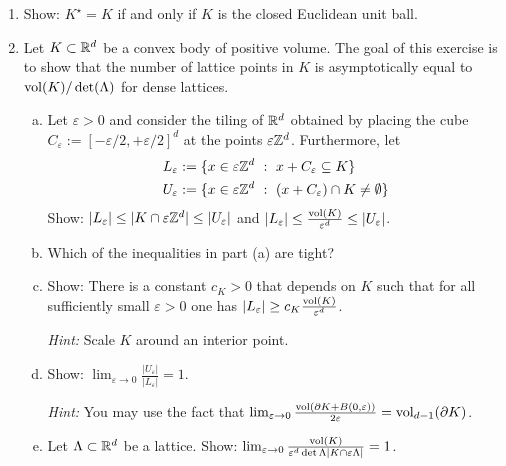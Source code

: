\begin{enumerate}
  \item Show: $K^\star = K$ if and only if $K$ is the closed Euclidean unit ball.
  
  \item Let $K \subset \mathbb{R}^d$ be a convex body of positive volume.
    The goal of this exercise is to show
    that the number of lattice points in $K$ is asymptotically equal to $\operatorname{vol}(K) / \det(\Lambda)$
    for dense lattices.
  \begin{enumerate}[(a)]
    \item Let $\varepsilon > 0$ and consider the tiling of $\mathbb{R}^d$
      obtained by placing the cube $C_\varepsilon := [-\varepsilon/2, +\varepsilon/2]^d$ at
      the points $\varepsilon \mathbb{Z}^d$.
      Furthermore, let
      \begin{align*}
        L_\varepsilon &:= \{x \in \varepsilon \mathbb{Z}^d ~:~ x + C_\varepsilon \subseteq K \} \\
        U_\varepsilon &:= \{x \in \varepsilon \mathbb{Z}^d ~:~ (x + C_\varepsilon) \cap K \neq \emptyset \}
      \end{align*}
      Show: $|L_\varepsilon| \leq |K \cap \varepsilon \mathbb{Z}^d| \leq |U_\varepsilon|$ and
        $|L_\varepsilon| \leq \frac{\operatorname{vol}(K)}{\varepsilon^d} \leq |U_\varepsilon|$.
    
    \item Which of the inequalities in part (a) are tight?

    \item Show: There is a constant $c_K > 0$ that depends on $K$
      such that for all sufficiently small $\varepsilon > 0$ one has $|L_\varepsilon| \geq c_K \frac{\operatorname{vol}(K)}{\varepsilon^d}$.
      
      \emph{Hint:} Scale $K$ around an interior point.
    
    \item Show: $\lim_{\varepsilon \to 0} \frac{|U_\varepsilon|}{|L_\varepsilon|} = 1$.
    
    \emph{Hint:} You may use the fact that
      $\lim_{\varepsilon \to 0} \frac{\operatorname{vol}(\partial K + B(0,\varepsilon))}{2\varepsilon} = \operatorname{vol}_{d-1}(\partial K)$.

    \item Let $\Lambda \subset \mathbb{R}^d$ be a lattice.
      Show: $\lim_{\varepsilon \to 0} \frac{\operatorname{vol}(K)}{\varepsilon^d \det\Lambda |K \cap \varepsilon \Lambda|} = 1$.
  \end{enumerate}
\end{enumerate}
